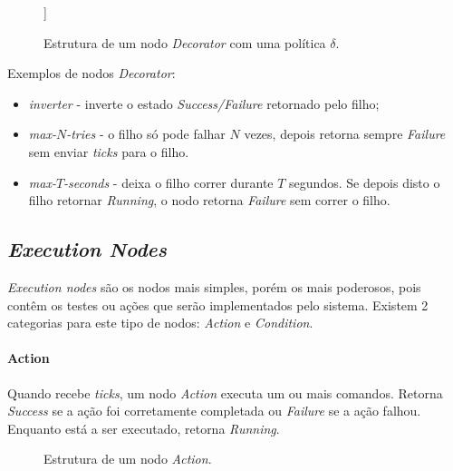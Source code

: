     \begin{figure}[H]
    \centering
    \begin{behavior}
        [\decorator{$\delta$},
            [\action{Child}]
        ]
    \end{behavior}
    \caption{Estrutura de um nodo \textit{Decorator} com uma política $\delta$.}
    \label{fig:2.5}
    \end{figure}
    
    Exemplos de nodos \textit{Decorator}:
    \begin{itemize}
        \item \textit{inverter} - inverte o estado \textit{Success/Failure} retornado pelo filho;
        \item \textit{max-$N$-tries} - o filho só pode falhar $N$ vezes, depois retorna sempre \textit{Failure} sem enviar \textit{ticks} para o filho.
        \item \textit{max-$T$-seconds} - deixa o filho correr durante $T$ segundos. Se depois disto o filho retornar \textit{Running}, o nodo retorna \textit{Failure} sem correr o filho.
    \end{itemize}






\subsection{\textit{Execution Nodes}}
\textit{Execution nodes} são os nodos mais simples, porém os mais poderosos, pois contêm os testes ou ações que serão implementados pelo sistema.
Existem 2 categorias para este tipo de nodos: \textit{Action} e \textit{Condition}.

\paragraph{Action}{
    Quando recebe \textit{ticks}, um nodo \textit{Action} executa um ou mais comandos.
    Retorna \textit{Success} se a ação foi corretamente completada ou \textit{Failure} se a ação falhou.
    Enquanto está a ser executado, retorna \textit{Running}.

    \begin{figure}[H]
    \centering
    \begin{behavior}
    \end{behavior}
    \caption{Estrutura de um nodo \textit{Action}.}
    \label{fig:2.7}
    \end{figure}
}

